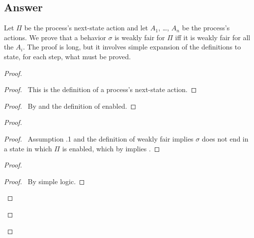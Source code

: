 \documentclass[fleqn,leqno]{article}
\begin{document}
\subsection*{Answer}

Let $\Pi$ be the process's next-state action and let $A_{1}$, \ldots,
$A_{n}$ be the process's actions.  We prove that a behavior $\sigma$
is weakly fair for $\Pi$ iff it is weakly fair for all the $A_{i}$.
The proof is long, but it involves simple expansion of the definitions
to state, for each step, what must be proved.

\begin{proof}
\vspace{.2em}
\begin{proof}
\pf\ This is the definition of a process's next-state action.
\end{proof}
\vspace{.6em}

\vspace{.2em}
\begin{proof}
\pf\ By  and the definition of enabled.
\end{proof}
\vspace{.6em}

\vspace{.2em}
\begin{proof}
\vspace{.2em}
 \begin{proof}
 \pf\ Assumption .1 and the definition of weakly fair implies
   $\sigma$ does not end in a state in which $\Pi$ is enabled, which
   by  implies .
 \end{proof}
\vspace{.6em}

\vspace{.2em}
  \begin{proof}
\vspace{.2em}
    \begin{proof}
    \pf\ By simple logic.
    \end{proof}
\vspace{.2em}
   

\end{proof}
\end{proof}
\end{proof}
\end{document}
